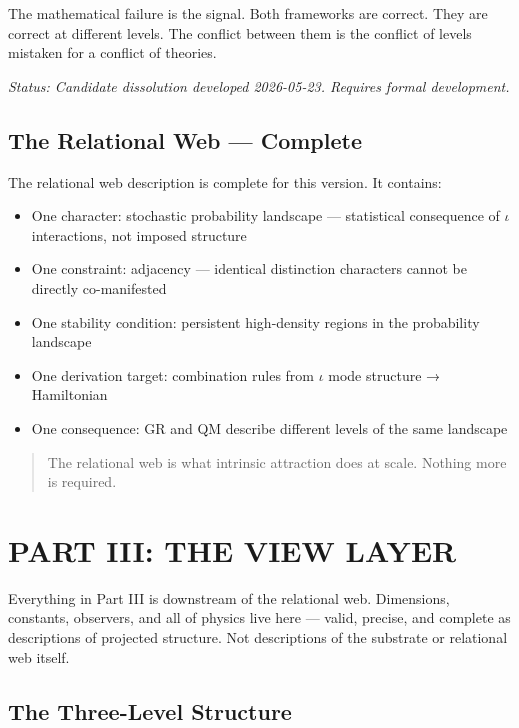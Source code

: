 \documentclass[11pt,letterpaper]{article}
\begin{document}
The mathematical failure is the signal. Both frameworks are correct. They are correct at different levels. The conflict between them is the conflict of levels mistaken for a conflict of theories.

\emph{Status: Candidate dissolution developed 2026-05-23. Requires formal development.}

\subsection{The Relational Web --- Complete}
\label{sec:orgccf0647}

The relational web description is complete for this version. It contains:

\begin{itemize}
\item One character: stochastic probability landscape --- statistical consequence of \(\iota\) interactions, not imposed structure
\item One constraint: adjacency --- identical distinction characters cannot be directly co-manifested
\item One stability condition: persistent high-density regions in the probability landscape
\item One derivation target: combination rules from \(\iota\) mode structure → Hamiltonian
\item One consequence: GR and QM describe different levels of the same landscape
\end{itemize}

\begin{quote}
The relational web is what intrinsic attraction does at scale. Nothing more is required.
\end{quote}

\section{PART III: THE VIEW LAYER}
\label{sec:orgcb33248}

Everything in Part III is downstream of the relational web. Dimensions, constants, observers, and all of physics live here --- valid, precise, and complete as descriptions of projected structure. Not descriptions of the substrate or relational web itself.

\subsection{The Three-Level Structure}
\label{sec:orgd8f21fe}
\end{document}
